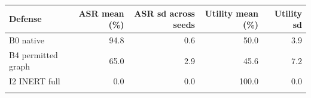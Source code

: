 \begin{tabular}{@{}lrrrr@{}}
\toprule
Defense & ASR mean (\%) & ASR sd across seeds & Utility mean (\%) & Utility sd \\
\midrule
B0 native & 94.8 & 0.6 & 50.0 & 3.9 \\
B4 permitted graph & 65.0 & 2.9 & 45.6 & 7.2 \\
I2 INERT full & 0.0 & 0.0 & 100.0 & 0.0 \\
\botrule
\end{tabular}
